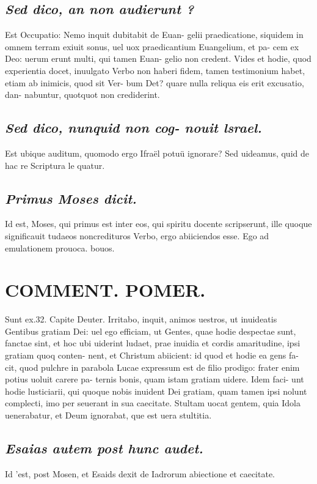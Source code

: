 \documentclass{article}
\begin{document}
\begin{pages}
\subsection*{\textit{Sed dico, an non audierunt ? }}\pstart Est Occupatio: Nemo inquit dubitabit de Euan- gelii praedicatione, siquidem in omnem terram exiuit sonus, uel uox praedicantium Euangelium, et pa- cem ex Deo: uerum erunt multi, qui tamen Euan- gelio non credent. Vides et hodie, quod experientia docet, inuulgato Verbo non haberi fidem, tamen testimonium habet, etiam ab inimicis, quod sit Ver- bum Det? quare nulla reliqua eis erit excusatio, dan- nabuntur, quotquot non crediderint.   \pend
{}
{}
\subsection*{\textit{Sed dico, nunquid non cog- nouit lsrael. }}\pstart Est ubique auditum, quomodo ergo Ifraël potuü ignorare? Sed uideamus, quid de hac re Scriptura le quatur.   \pend
{}
{}
\subsection*{\textit{Primus Moses dicit. }}\pstart Id est, Moses, qui primus est inter eos, qui spiritu docente scripserunt, ille quoque significauit tudaeos noncredituros Verbo, ergo abiiciendos esse.  \pend\pstart Ego ad emulationem prouoca. bouos.  \pend
\section*{COMMENT. POMER.  }\pstart Sunt ex.32. Capite Deuter. Irritabo, inquit, animos uestros, ut inuideatis Gentibus gratiam Dei: uel ego efficiam, ut Gentes, quae hodie despectae sunt, fanctae sint, et hoc ubi uiderint ludaet, prae inuidia et cordis amaritudine, ipsi gratiam quoq conten- nent, et Christum abiicient: id quod et hodie ea gens fa- cit, quod pulchre in parabola Lucae expressum est de filio prodigo: frater enim potius uoluit carere pa- ternis bonis, quam istam gratiam uidere. Idem faci- unt hodie lusticiarii, qui quoque nobis inuident Dei gratiam, quam tamen ipsi nolunt complecti, imo per seuerant in sua caecitate. Stultam uocat gentem, quia Idola uenerabatur, et Deum ignorabat, que est uera stultitia.   \pend
{}
{}
\subsection*{\textit{Esaias autem post hunc audet. }}\pstart Id 'est, post Mosen, et Esaids dexit de Iadrorum abiectione et caecitate.  \pend
{}
{}

\end{pages}
\end{document}
